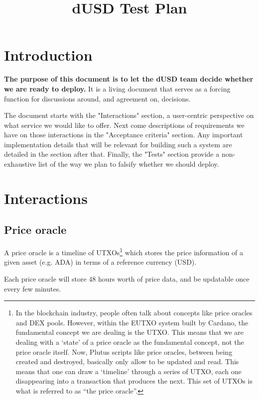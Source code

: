 \documentclass{article} %
\title{dUSD Test Plan}
\begin{document}
\maketitle

\section{Introduction}

\textbf{The purpose of this document is to let the dUSD team decide whether we are ready to deploy.}
It is a living document that serves as a forcing function for discussions around, and agreement on, decisions.

The document starts with the "Interactions" section, a user-centric perspective on what service we would like to offer.
Next come descriptions of requirements we have on those interactions in the "Acceptance criteria" section.
Any important implementation details that will be relevant for building such a system are detailed in the section after that.
Finally, the "Tests" section provide a non-exhaustive list of the way we plan to falsify whether we should deploy.

\section{Interactions}

\subsection{Price oracle}

A price oracle is a timeline of UTXOs\footnote{
  In the blockchain industry, people often talk about concepts like price
  oracles and DEX pools. However, within the EUTXO system built by Cardano, the
  fundamental concept we are dealing is the UTXO. This means that we are dealing
  with a `state' of a price oracle as the fundamental concept, not the price
  oracle itself. Now, Plutus scripts like price oracles, between being created
  and destroyed, basically only allow to be updated and read. This means that
  one can draw a `timeline' through a series of UTXO, each one disappearing into
  a transaction that produces the next. This set of UTXOs is what is referred to
  as ``the price oracle''.
}
which stores the price information of a given asset (e.g. ADA) in terms of a
reference currency (USD).

Each price oracle will store $48$ hours worth of price data, and be updatable
once every few minutes.
\end{document}
